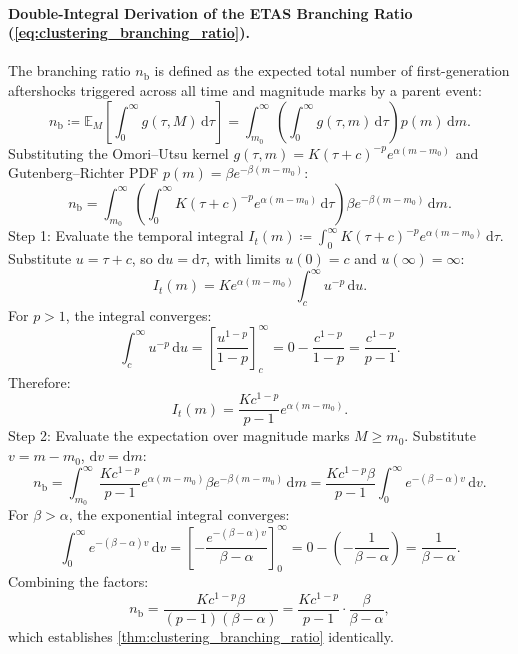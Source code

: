 \paragraph{Double-Integral Derivation of the ETAS Branching Ratio
(\cref{eq:clustering_branching_ratio}).}
The branching ratio $n_{\mathrm{b}}$ is defined as the expected total number of
first-generation aftershocks triggered across all time and magnitude
marks by a parent event:
\begin{equation}
  n_{\mathrm{b}} \coloneqq \mathbb{E}_M\left[ \int_0^\infty g(\tau,
  M)\,\mathrm{d}\tau \right]
  = \int_{m_0}^\infty \left( \int_0^\infty g(\tau,
  m)\,\mathrm{d}\tau \right) p(m)\,\mathrm{d}m.
\end{equation}
Substituting the Omori--Utsu kernel $g(\tau, m) = K(\tau + c)^{-p}
e^{\alpha(m - m_0)}$
and Gutenberg--Richter PDF $p(m) = \beta e^{-\beta(m - m_0)}$:
\begin{equation}
  n_{\mathrm{b}} = \int_{m_0}^\infty \left( \int_0^\infty K(\tau +
  c)^{-p} e^{\alpha(m - m_0)}\,\mathrm{d}\tau \right) \beta
  e^{-\beta(m - m_0)}\,\mathrm{d}m.
\end{equation}
Step 1: Evaluate the temporal integral $I_t(m) \coloneqq
\int_0^\infty K(\tau + c)^{-p} e^{\alpha(m - m_0)}\,\mathrm{d}\tau$.
Substitute $u = \tau + c$, so $\mathrm{d}u = \mathrm{d}\tau$, with
limits $u(0) = c$ and $u(\infty) = \infty$:
\begin{equation}
  I_t(m) = K e^{\alpha(m - m_0)} \int_c^\infty u^{-p}\,\mathrm{d}u.
\end{equation}
For $p > 1$, the integral converges:
\begin{equation}
  \int_c^\infty u^{-p}\,\mathrm{d}u = \left[ \frac{u^{1-p}}{1 - p}
  \right]_c^\infty = 0 - \frac{c^{1-p}}{1 - p} = \frac{c^{1-p}}{p - 1}.
\end{equation}
Therefore:
\begin{equation}
  I_t(m) = \frac{K c^{1-p}}{p - 1} e^{\alpha(m - m_0)}.
  \label{eq:supp_omori_integrated}
\end{equation}
Step 2: Evaluate the expectation over magnitude marks $M \ge m_0$.
Substitute $v = m - m_0$, $\mathrm{d}v = \mathrm{d}m$:
\begin{equation}
  n_{\mathrm{b}} = \int_{m_0}^\infty \frac{K c^{1-p}}{p - 1}
  e^{\alpha(m - m_0)} \beta e^{-\beta(m - m_0)}\,\mathrm{d}m
  = \frac{K c^{1-p}\beta}{p - 1} \int_0^\infty e^{-(\beta -
  \alpha)v}\,\mathrm{d}v.
\end{equation}
For $\beta > \alpha$, the exponential integral converges:
\begin{equation}
  \int_0^\infty e^{-(\beta - \alpha)v}\,\mathrm{d}v = \left[
  -\frac{e^{-(\beta - \alpha)v}}{\beta - \alpha} \right]_0^\infty =
  0 - \left(-\frac{1}{\beta - \alpha}\right) = \frac{1}{\beta - \alpha}.
\end{equation}
Combining the factors:
\begin{equation}
  n_{\mathrm{b}} = \frac{K c^{1-p}\beta}{(p - 1)(\beta - \alpha)} =
  \frac{K c^{1-p}}{p - 1} \cdot \frac{\beta}{\beta - \alpha},
\end{equation}
which establishes \cref{thm:clustering_branching_ratio} identically.

